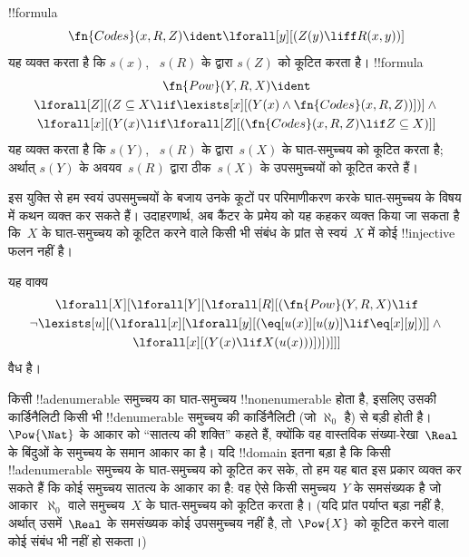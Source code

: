 \documentclass[../../../include/open-logic-section]{subfiles}
\begin{document}
\begin{prop}
!!{formula}
  \[
  \fn{Codes}(x, R, Z) \ident \lforall[y][(Z(y) \liff
    R(x, y))]
  \]
यह व्यक्त करता है कि $s(x)$, ~$s(R)$ के द्वारा $s(Z)$ को कूटित करता है।
!!{formula}
\begin{multline*}
  \fn{Pow}(Y, R, X) \ident \\
  \lforall[Z][(Z \subseteq X \lif \lexists[x][(Y(x) \land
    \fn{Codes}(x, R, Z))])] \land {} \\ \lforall[x][(Y(x) \lif
  \lforall[Z][(\fn{Codes}(x, R, Z) \lif Z \subseteq X)]]
\end{multline*}
यह व्यक्त करता है कि $s(Y)$, ~$s(R)$ के द्वारा~$s(X)$ के घात-समुच्चय को
कूटित करता है; अर्थात् $s(Y)$ के अवयव~$s(R)$ द्वारा ठीक~$s(X)$ के
उपसमुच्चयों को कूटित करते हैं।
\end{prop}

\begin{explain}
इस युक्ति से हम स्वयं उपसमुच्चयों के बजाय उनके कूटों पर परिमाणीकरण करके
घात-समुच्चय के विषय में कथन व्यक्त कर सकते हैं। उदाहरणार्थ, अब कैंटर के
प्रमेय को यह कहकर व्यक्त किया जा सकता है कि~$X$ के घात-समुच्चय को कूटित
करने वाले किसी भी संबंध के प्रांत से स्वयं~$X$ में कोई !!{injective} फलन
नहीं है।
\end{explain}

\begin{prop}
यह वाक्य
\begin{multline*}
  \lforall[X][\lforall[Y][\lforall[R][(\fn{Pow}(Y, R, X) \lif \\
      \lnot \lexists[u][(\lforall[x][\lforall[y][(\eq[u(x)][u(y)] \lif
            \eq[x][y])]] \land {}\\
        \lforall[x][(Y(x) \lif X(u(x)))])])]]]
\end{multline*}
वैध है।
\end{prop}

\begin{explain}
किसी !!a{denumerable} समुच्चय का घात-समुच्चय !!{nonenumerable} होता है,
इसलिए उसकी कार्डिनैलिटी किसी भी !!{denumerable} समुच्चय की कार्डिनैलिटी
(जो $\aleph_0$ है) से बड़ी होती है। $\Pow{\Nat}$ के आकार को ``सातत्य की
शक्ति'' कहते हैं, क्योंकि वह वास्तविक संख्या-रेखा~$\Real$ के बिंदुओं के
समुच्चय के समान आकार का है। यदि !!{domain} इतना बड़ा है कि किसी
!!a{denumerable} समुच्चय के घात-समुच्चय को कूटित कर सके, तो हम यह बात इस
प्रकार व्यक्त कर सकते हैं कि कोई समुच्चय सातत्य के आकार का है: वह ऐसे किसी
समुच्चय~$Y$ के समसंख्यक है जो आकार~$\aleph_0$ वाले समुच्चय~$X$ के
घात-समुच्चय को कूटित करता है। (यदि प्रांत पर्याप्त बड़ा नहीं है, अर्थात्
उसमें~$\Real$ के समसंख्यक कोई उपसमुच्चय नहीं है, तो~$\Pow{X}$ को कूटित करने
वाला कोई संबंध भी नहीं हो सकता।)
\end{explain}
\end{document}
